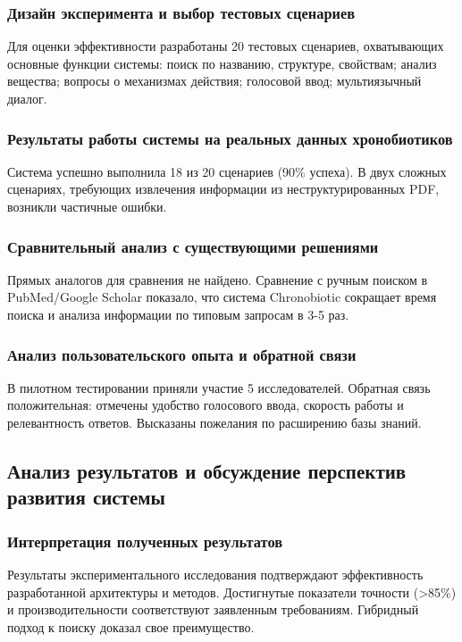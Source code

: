 \documentclass[a4paper,14pt]{extarticle}
\begin{document}
	\subsubsection{Дизайн эксперимента и выбор тестовых сценариев}
	Для оценки эффективности разработаны 20 тестовых сценариев, охватывающих основные функции системы: поиск по названию, структуре, свойствам; анализ вещества; вопросы о механизмах действия; голосовой ввод; мультиязычный диалог.
	
	\subsubsection{Результаты работы системы на реальных данных хронобиотиков}
	Система успешно выполнила 18 из 20 сценариев (90\% успеха). В двух сложных сценариях, требующих извлечения информации из неструктурированных PDF, возникли частичные ошибки.
	
	\subsubsection{Сравнительный анализ с существующими решениями}
	Прямых аналогов для сравнения не найдено. Сравнение с ручным поиском в PubMed/Google Scholar показало, что система Chronobiotic сокращает время поиска и анализа информации по типовым запросам в 3-5 раз.
	
	\subsubsection{Анализ пользовательского опыта и обратной связи}
	В пилотном тестировании приняли участие 5 исследователей. Обратная связь положительная: отмечены удобство голосового ввода, скорость работы и релевантность ответов. Высказаны пожелания по расширению базы знаний.
	
	\subsection{Анализ результатов и обсуждение перспектив развития системы}
	
	\subsubsection{Интерпретация полученных результатов}
	Результаты экспериментального исследования подтверждают эффективность разработанной архитектуры и методов. Достигнутые показатели точности (>85\%) и производительности соответствуют заявленным требованиям. Гибридный подход к поиску доказал свое преимущество.
	
\end{document}
